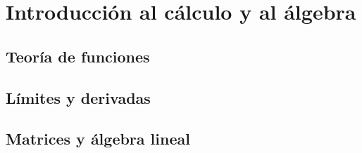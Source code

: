 
\chapter{Introducción al cálculo y al álgebra}


\newpage


\newpage
\section{Teoría de funciones}

\newpage
\section{Límites y derivadas}

\newpage
\section{Matrices y álgebra lineal}


